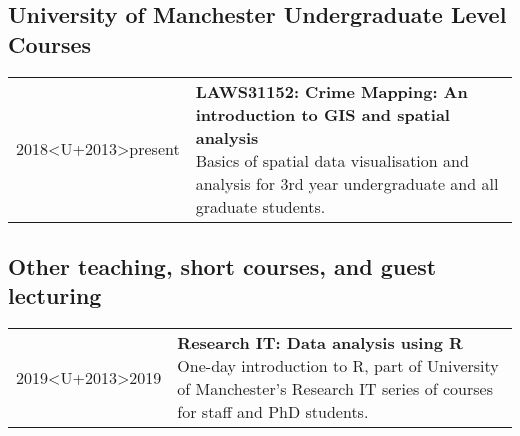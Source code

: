 \documentclass[10pt,a4paper,]{article}
\makeatletter
\def\briefitem#1#2#3{
#2 & \parbox[t]{0.85\textwidth}{%
      \textbf{#1}\\[-0.1cm]{\footnotesize #3}}\\[0.4cm]}
\def\briefsection#1{\begin{longtable}{@{\extracolsep{\fill}}ll}#1\end{longtable}}
\makeatother
\begin{document}
\hypertarget{university-of-manchester-undergraduate-level-courses}{%
\subsection{University of Manchester Undergraduate Level Courses}\label{university-of-manchester-undergraduate-level-courses}}

\briefsection{\briefitem{LAWS31152: Crime Mapping: An introduction to GIS and spatial analysis}{2018<U+2013>present}{Basics of spatial data visualisation and analysis for 3rd year undergraduate and all graduate students.}\briefitem{LAWS20452 : Modelling Criminological Data}{2017<U+2013>present}{Inferential statistics course for 2nd year undergraduates.}\briefitem{LAWS30620: Short Dissertation}{2017<U+2013>present}{Lectures and supervision of students on secondary data analysis pathway for their final year dissertation.}\briefitem{LAWS20441: Making Sense of Criminological Data}{2016<U+2013>present}{Introduction to quantitative research for 2nd year undergraduates.}}

\hypertarget{other-teaching-short-courses-and-guest-lecturing}{%
\subsection{Other teaching, short courses, and guest lecturing}\label{other-teaching-short-courses-and-guest-lecturing}}

\briefsection{\briefitem{Research IT: Data analysis using R}{2019<U+2013>2019}{One-day introduction to R, part of University of Manchester's Research IT series of courses for staff and PhD students.}\briefitem{methods@manchester: Getting Started in R: introduction to data analysis \& visualisation}{2017<U+2013>present}{Weeklong intensive course introducing students to using R and R Studio for data analysis. Open to all, usually attended by professionals and academics.}\briefitem{Q-Step internship preparation: Introduction to mapping data with QGIS}{2017<U+2013>present}{Afternoon short introduction to mapping spatial data for Q-step internship students}\briefitem{Stockholm Royal Institute of Technology (KTH): Spatial Data Analysis in Practice}{2017<U+2013>2017}{One-day introduction to mapping with QGIS and data collection from APIs as part of weeklong summer school for PhD students}\briefitem{University College London MSc Transport Studies: Trasport Safety and Security}{2012<U+2013>2017}{Guest lecture for graduate module, UCL Department of Civil, Environmental, and Geomatic Engineering}}
\end{document}
